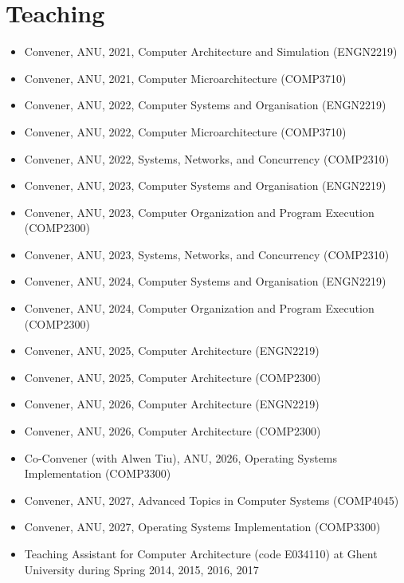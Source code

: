 \documentclass[singlecolumn,singlespace,11pt,a4paper]{article}
\begin{document}
\section*{Teaching}
\begin{itemize}
\item Convener, ANU, 2021, Computer Architecture and Simulation (ENGN2219)
\item Convener, ANU, 2021, Computer Microarchitecture (COMP3710) 
\item Convener, ANU, 2022, Computer Systems and Organisation (ENGN2219)
\item Convener, ANU, 2022, Computer Microarchitecture (COMP3710) 
\item Convener, ANU, 2022, Systems, Networks, and Concurrency (COMP2310) 
\item Convener, ANU, 2023, Computer Systems and Organisation (ENGN2219) 
\item Convener, ANU, 2023, Computer Organization and Program Execution (COMP2300) 
\item Convener, ANU, 2023, Systems, Networks, and Concurrency (COMP2310) 
\item Convener, ANU, 2024, Computer Systems and Organisation (ENGN2219) 
\item Convener, ANU, 2024, Computer Organization and Program Execution (COMP2300)
\item Convener, ANU, 2025, Computer Architecture (ENGN2219) 
\item Convener, ANU, 2025, Computer Architecture (COMP2300)
\item Convener, ANU, 2026, Computer Architecture (ENGN2219) 
\item Convener, ANU, 2026, Computer Architecture (COMP2300)
\item Co-Convener (with Alwen Tiu), ANU, 2026, Operating Systems Implementation (COMP3300)
\item Convener, ANU, 2027, Advanced Topics in Computer Systems (COMP4045)
\item Convener, ANU, 2027, Operating Systems Implementation (COMP3300)
\item Teaching Assistant for Computer Architecture (code E034110) at Ghent University during Spring 2014, 2015, 2016, 2017
\end{itemize}

%
%
%
%
%
\end{document}

